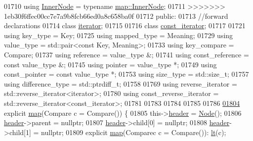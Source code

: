 \begin{DoxyCode}
01710         \textcolor{keyword}{using} \hyperlink{structaed2_1_1iterator_1_1InnerNode}{InnerNode} = \textcolor{keyword}{typename} \hyperlink{structaed2_1_1map_1_1InnerNode}{map::InnerNode};
01711 >>>>>>> 1eb30f6ffec00cc7e7a9b8fcb66ed0a8c658ba0f
01712     \textcolor{keyword}{public}:
01713         \textcolor{comment}{//forward declarations}
01714         \textcolor{keyword}{class }\hyperlink{classaed2_1_1iterator_1_1iterator}{iterator};
01715 
01716         \textcolor{keyword}{class }\hyperlink{classaed2_1_1iterator_1_1const__iterator}{const_iterator};
01717 
01721         \textcolor{keyword}{using} key\_type = Key;
01725         \textcolor{keyword}{using} mapped\_type = Meaning;
01729         \textcolor{keyword}{using} value\_type = std::pair<const Key, Meaning>;
01733         \textcolor{keyword}{using} key\_compare = Compare;
01737         \textcolor{keyword}{using} reference = value\_type &;
01741         \textcolor{keyword}{using} const\_reference = \textcolor{keyword}{const} value\_type &;
01745         \textcolor{keyword}{using} pointer = value\_type *;
01749         \textcolor{keyword}{using} const\_pointer = \textcolor{keyword}{const} value\_type *;
01753         \textcolor{keyword}{using} size\_type = std::size\_t;
01757         \textcolor{keyword}{using} difference\_type = std::ptrdiff\_t;
01758 
01769         \textcolor{keyword}{using} reverse\_iterator = std::reverse\_iterator<iterator>;
01780         \textcolor{keyword}{using} const\_reverse\_iterator = std::reverse\_iterator<const\_iterator>;
01781 
01783 
01784 
01785 
01786 
\hypertarget{map2_8h_source_l01804}{}\hyperlink{classaed2_1_1iterator_ab55f7bc4639e905d66935b56995a5b1f_ab55f7bc4639e905d66935b56995a5b1f}{01804}         \textcolor{keyword}{explicit} \hyperlink{classaed2_1_1iterator_ab55f7bc4639e905d66935b56995a5b1f_ab55f7bc4639e905d66935b56995a5b1f}{map}(Compare c = Compare()) \{
01805             this->\hyperlink{classaed2_1_1iterator_a19db18e2e77583eb1fa819e854ff9c71_a19db18e2e77583eb1fa819e854ff9c71}{header} = \hyperlink{structaed2_1_1iterator_1_1Node}{Node}();
01806             \hyperlink{classaed2_1_1iterator_a19db18e2e77583eb1fa819e854ff9c71_a19db18e2e77583eb1fa819e854ff9c71}{header}->parent = \textcolor{keyword}{nullptr};
01807             \hyperlink{classaed2_1_1iterator_a19db18e2e77583eb1fa819e854ff9c71_a19db18e2e77583eb1fa819e854ff9c71}{header}->child[0] = \textcolor{keyword}{nullptr};
01808             \hyperlink{classaed2_1_1iterator_a19db18e2e77583eb1fa819e854ff9c71_a19db18e2e77583eb1fa819e854ff9c71}{header}->child[1] = \textcolor{keyword}{nullptr};
01809             \textcolor{keyword}{explicit} \hyperlink{classaed2_1_1iterator_ab55f7bc4639e905d66935b56995a5b1f_ab55f7bc4639e905d66935b56995a5b1f}{map}(Comparec c = Compare()): \hyperlink{classaed2_1_1iterator_a3f219bfe5e047bbec03e3339770ae414_a3f219bfe5e047bbec03e3339770ae414}{lt}(c);

\end{DoxyCode}
